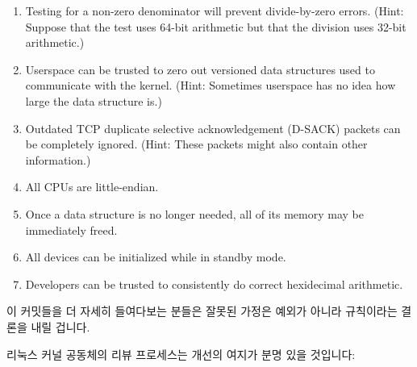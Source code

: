 {\begin{enumerate}
	\item	Testing for a non-zero denominator will prevent
		divide-by-zero errors.
		(Hint: Suppose that the test uses 64-bit arithmetic
		but that the division uses 32-bit arithmetic.)
	\item	Userspace can be trusted to zero out versioned data
		structures used to communicate with the kernel.
		(Hint: Sometimes userspace has no idea how large the
		data structure is.)
	\item	Outdated TCP duplicate selective acknowledgement (D-SACK)
		packets can be completely ignored.
		(Hint: These packets might also contain other information.)
	\item	All CPUs are little-endian.
	\item	Once a data structure is no longer needed, all of its
		memory may be immediately freed.
	\item	All devices can be initialized while in standby mode.
	\item	Developers can be trusted to consistently do correct
		hexidecimal arithmetic.

	\fi

	\end{enumerate}

	이 커밋들을 더 자세히 들여다보는 분들은 잘못된 가정은 예외가 아니라
	규칙이라는 결론을 내릴 겁니다.

}\QuickQuizEnd

리눅스 커널 공동체의 리뷰 프로세스는 개선의 여지가 분명 있을 것입니다:

